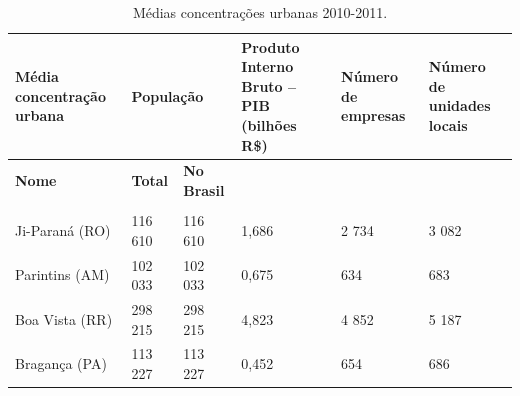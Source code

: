 \begin{table}[htb]
	\ABNTEXfontereduzida
	\caption{\label{tab:Tab_1}Médias concentrações urbanas 2010-2011.}
	\begin{tabular}{@{}p{3.0cm}p{1.5cm}p{2cm}p{2.5cm}p{2.5cm}p{2.5cm}@{}}
		\toprule
		\textbf{Média concentração urbana} & \multicolumn{2}{l}{\textbf{População}} & \textbf{Produto Interno Bruto – PIB (bilhões R\$)} & \textbf{Número de empresas} & \textbf{Número de unidades locais} \\ \midrule
		\textbf{Nome}                      & \textbf{Total}   & \textbf{No Brasil}  &                                                   &                             & \\
		                      &    &    &                                                   &                             & \\
		Ji-Paraná (RO)                     & 116 610          & 116 610             & 1,686                                             & 2 734                       & 3 082 \\
		Parintins (AM)                     & 102 033          & 102 033             & 0,675                                             & 634                         & 683 \\
		Boa Vista (RR)                     & 298 215          & 298 215             & 4,823                                             & 4 852                       & 5 187 \\
		Bragança (PA)                      & 113 227          & 113 227             & 0,452                                             & 654                         & 686 \\ \bottomrule
	\end{tabular}
\end{table}
